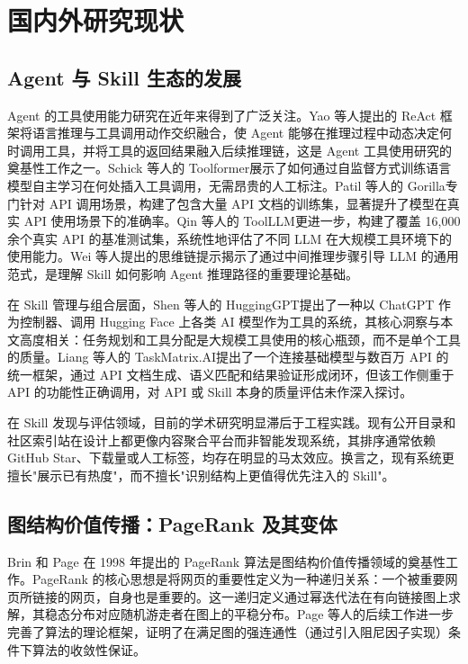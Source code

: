 \section{国内外研究现状}
\label{sec:related_work}

\subsection{Agent 与 Skill 生态的发展}

Agent 的工具使用能力研究在近年来得到了广泛关注。Yao 等人提出的 ReAct 框架\cite{yao2023react}将语言推理与工具调用动作交织融合，使 Agent 能够在推理过程中动态决定何时调用工具，并将工具的返回结果融入后续推理链，这是 Agent 工具使用研究的奠基性工作之一。Schick 等人的 Toolformer\cite{schick2023toolformer}展示了如何通过自监督方式训练语言模型自主学习在何处插入工具调用，无需昂贵的人工标注。Patil 等人的 Gorilla\cite{patil2023gorilla}专门针对 API 调用场景，构建了包含大量 API 文档的训练集，显著提升了模型在真实 API 使用场景下的准确率。Qin 等人的 ToolLLM\cite{qin2024toolllm}更进一步，构建了覆盖 16,000 余个真实 API 的基准测试集，系统性地评估了不同 LLM 在大规模工具环境下的使用能力。Wei 等人提出的思维链提示\cite{wei2022chain}揭示了通过中间推理步骤引导 LLM 的通用范式，是理解 Skill 如何影响 Agent 推理路径的重要理论基础。

在 Skill 管理与组合层面，Shen 等人的 HuggingGPT\cite{shen2023hugginggpt}提出了一种以 ChatGPT 作为控制器、调用 Hugging Face 上各类 AI 模型作为工具的系统，其核心洞察与本文高度相关：任务规划和工具分配是大规模工具使用的核心瓶颈，而不是单个工具的质量。Liang 等人的 TaskMatrix.AI\cite{liang2024taskmatrix}提出了一个连接基础模型与数百万 API 的统一框架，通过 API 文档生成、语义匹配和结果验证形成闭环，但该工作侧重于 API 的功能性正确调用，对 API 或 Skill 本身的质量评估未作深入探讨。

在 Skill 发现与评估领域，目前的学术研究明显滞后于工程实践。现有公开目录和社区索引站在设计上都更像内容聚合平台而非智能发现系统，其排序通常依赖 GitHub Star、下载量或人工标签，均存在明显的马太效应。换言之，现有系统更擅长"展示已有热度"，而不擅长"识别结构上更值得优先注入的 Skill"。

\subsection{图结构价值传播：PageRank 及其变体}

Brin 和 Page 在 1998 年提出的 PageRank 算法\cite{brin1998anatomy}是图结构价值传播领域的奠基性工作。PageRank 的核心思想是将网页的重要性定义为一种递归关系：一个被重要网页所链接的网页，自身也是重要的。这一递归定义通过幂迭代法在有向链接图上求解，其稳态分布对应随机游走者在图上的平稳分布。Page 等人的后续工作\cite{page1999pagerank}进一步完善了算法的理论框架，证明了在满足图的强连通性（通过引入阻尼因子实现）条件下算法的收敛性保证。

